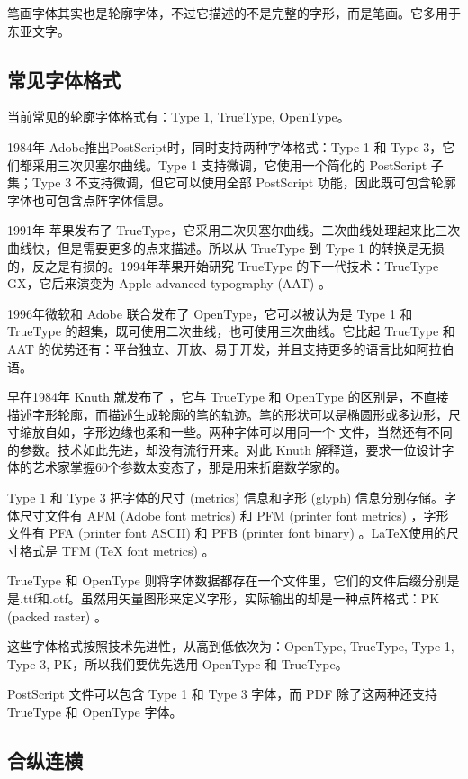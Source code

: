笔画字体其实也是轮廓字体，不过它描述的不是完整的字形，而是笔画。它多用于东亚文字。

\subsection{常见字体格式}

当前常见的轮廓字体格式有：Type 1, TrueType, OpenType。

1984年 Adobe\indexAdobe 推出PostScript时，同时支持两种字体格式：Type 1 和 Type 3，它们都采用三次贝塞尔曲线。Type 1 支持微调，它使用一个简化的 PostScript 子集；Type 3 不支持微调，但它可以使用全部 PostScript 功能，因此既可包含轮廓字体也可包含点阵字体信息。

1991年 苹果\indexApple 发布了 TrueType，它采用二次贝塞尔曲线。二次曲线处理起来比三次曲线快，但是需要更多的点来描述。所以从 TrueType 到 Type 1 的转换是无损的，反之是有损的。1994年苹果开始研究 TrueType 的下一代技术：TrueType GX，它后来演变为 Apple advanced typography (AAT) 。

1996年微软和 Adobe 联合发布了 OpenType，它可以被认为是 Type 1 和 TrueType 的超集，既可使用二次曲线，也可使用三次曲线。它比起 TrueType 和 AAT 的优势还有：平台独立、开放、易于开发，并且支持更多的语言比如阿拉伯语。

早在1984年 Knuth 就发布了 \MF ，它与 TrueType 和 OpenType 的区别是，不直接描述字形轮廓，而描述生成轮廓的笔的轨迹。笔的形状可以是椭圆形或多边形，尺寸缩放自如，字形边缘也柔和一些。两种字体可以用同一个 \MF 文件，当然还有不同的参数。\MF 技术如此先进，却没有流行开来。对此 Knuth 解释道，要求一位设计字体的艺术家掌握60个参数太变态了，那是用来折磨数学家的。

Type 1 和 Type 3 把字体的尺寸 (metrics) 信息和字形 (glyph) 信息分别存储。字体尺寸文件有 AFM (Adobe font metrics) 和 PFM (printer font metrics) ，字形文件有 PFA (printer font ASCII) 和 PFB (printer font binary) 。\LaTeX 使用的尺寸格式是 TFM (TeX font metrics) 。

TrueType 和 OpenType 则将字体数据都存在一个文件里，它们的文件后缀分别是是.ttf和.otf。\MF 虽然用矢量图形来定义字形，实际输出的却是一种点阵格式：PK (packed raster) 。

这些字体格式按照技术先进性，从高到低依次为：OpenType, TrueType, Type 1, Type 3, PK，所以我们要优先选用 OpenType 和 TrueType。

PostScript 文件可以包含 Type 1 和 Type 3 字体，而 PDF 除了这两种还支持 TrueType 和 OpenType 字体。

\subsection{合纵连横}


